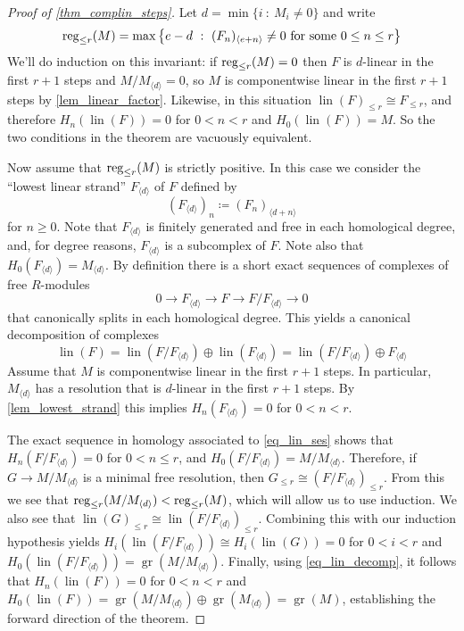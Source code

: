 \documentclass[a4paper,10pt]{amsart}
\theoremstyle{definition}
\theoremstyle{remark}
\DeclareMathOperator{\gr}{gr}
\DeclareMathOperator{\lin}{lin}
\begin{document}
\begin{proof}[Proof of \cref{thm_complin_steps}]

Let $d=\min\{i~:~ M_i\neq 0\}$ and write
\[
{\rm reg}_{\leq r}(M) = \max\left\{ e-d ~:~ (F_n)_{\langle e+n\rangle} \neq 0\text{ for some } 0\leq n\leq r\right\}
\]
We'll do induction on this invariant: if ${\rm reg}_{\leq r}(M) =0$ then $F$ is $d$-linear in the first $r+1$ steps and $M/M_{\langle d\rangle}=0$, so $M$ is componentwise linear in the first $r+1$ steps by \cref{lem_linear_factor}.
Likewise, in this situation $\lin(F)_{\leq r}\cong F_{\leq r}$, and therefore $H_n(\lin(F))=0$ for $0<n<r$ and $H_0(\lin(F))=M$. So the two conditions in the theorem are vacuously equivalent.

Now assume that ${\rm reg}_{\leq r}(M)$ is strictly positive. In this case we consider the ``lowest linear strand'' $F_{\langle d \rangle}$ of $F$ defined by
\[
(F_{\langle d \rangle})_n\coloneqq (F_n)_{\langle d+n\rangle}
\]
for $n\geq 0$. Note that $F_{\langle d \rangle}$ is finitely generated and free in each homological degree, and, for degree reasons, $F_{\langle d \rangle}$ is a subcomplex of $F$. Note also that $H_0(F_{\langle d \rangle})=M_{\langle d \rangle}$. By definition there is a short exact sequences of complexes of free $R$-modules
\begin{equation}\label{eq_lin_ses}
0\to F_{\langle d \rangle} \to  F\to F/ F_{\langle d \rangle}\to 0
\end{equation}
that canonically splits in each homological degree. This yields a canonical decomposition of complexes
\begin{equation}\label{eq_lin_decomp}
    \lin(F) = \lin(F/ F_{\langle d \rangle}) \oplus \lin(F_{\langle d \rangle}) = \lin(F/ F_{\langle d \rangle}) \oplus F_{\langle d \rangle}
\end{equation}
Assume that $M$ is componentwise linear in the first $r+1$ steps. In particular, $M_{\langle d\rangle}$ has a resolution that is  $d$-linear in the first $r+1$ steps. By \cref{lem_lowest_strand} this implies $H_n(F_{\langle d \rangle})=0$ for $0<n<r$.

The exact sequence in homology associated to \eqref{eq_lin_ses} shows that $H_n(F/F_{\langle d\rangle})=0$ for $0<n\leq r$, and $H_0(F/F_{\langle d\rangle})=M/M_{\langle d\rangle}$.
Therefore, if $G\to M/M_{\langle d\rangle}$ is a minimal free resolution, then $G_{\leq r}\cong (F/F_{\langle d\rangle})_{\leq r}$. From this we see that ${\rm reg}_{\leq r}(M/M_{\langle d\rangle})<{\rm reg}_{\leq r}(M)$, which will allow us to use induction. We also see that $\lin(G)_{\leq r}\cong 
\lin(F/F_{\langle d\rangle})_{\leq r}$.  Combining this with our induction hypothesis yields $H_i(\lin(F/F_{\langle d\rangle}))\cong H_i(\lin(G)) =0$ for $0<i<r$ and $H_0(\lin(F/F_{\langle d\rangle}))=\gr(M/M_{\langle d\rangle})$. Finally, using \eqref{eq_lin_decomp}, it follows that $H_n(\lin(F))=0$ for $0<n<r$  and $H_0(\lin(F))= \gr(M/M_{\langle d\rangle})\oplus \gr(M_{\langle d\rangle})=\gr(M)$, establishing the forward direction of the theorem.


\end{proof}
\end{document}

